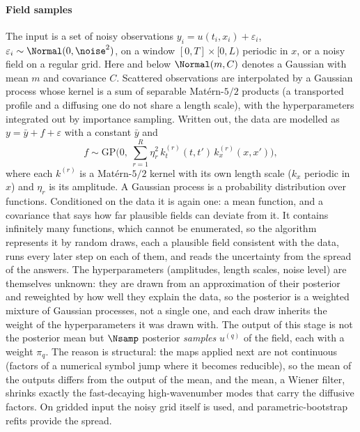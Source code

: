 \paragraph{Field samples} The input is a set of noisy observations $y_i=u(t_i,x_i)+\varepsilon_i$,
$\varepsilon_i\sim\Normal(0,\noise^2)$, on a window $[0,T]\times[0,L)$ periodic in $x$, or a noisy field on a regular grid. Here and below $\Normal(m,C)$ denotes a Gaussian with mean $m$ and covariance $C$.
Scattered observations are interpolated by a Gaussian process whose kernel is a sum of separable Mat\'ern-$5/2$
products (a transported profile and a diffusing one do not share a length scale), with the hyperparameters integrated
out by importance sampling. Written out, the data are modelled as $y=\bar y+f+\varepsilon$ with a constant $\bar y$ and
\begin{equation}\label{eq:gp}
  f\sim\mathrm{GP}\Big(0,\ \sum_{r=1}^R\eta_r^2\,k_t^{(r)}(t,t')\,k_x^{(r)}(x,x')\Big),
\end{equation}
where each $k^{(r)}$ is a Mat\'ern-$5/2$ kernel with its own length scale ($k_x$ periodic in $x$) and $\eta_r$ is its
amplitude. A Gaussian process is a probability distribution over functions. Conditioned on the data it is again one: a
mean function, and a covariance that says how far plausible fields can deviate from it. It contains infinitely many
functions, which cannot be enumerated, so the algorithm represents it by random draws, each a plausible field
consistent with the data, runs every later step on each of them, and reads the uncertainty from the spread of the
answers. The hyperparameters (amplitudes, length scales, noise level) are themselves unknown: they are drawn from an
approximation of their posterior and reweighted by how well they explain the data, so the posterior is a weighted
mixture of Gaussian processes, not a single one, and each draw inherits the weight of the hyperparameters it was drawn
with. The output of this stage is not the posterior mean but $\Nsamp$ posterior \emph{samples}
$u^{(q)}$ of the field, each with a weight $\pi_q$. The reason is structural: the maps applied next are not continuous
(factors of a numerical symbol jump where it becomes reducible), so the mean of the outputs differs from the output of
the mean, and the mean, a Wiener filter, shrinks exactly the fast-decaying high-wavenumber modes that carry the
diffusive factors. On gridded input the noisy grid itself is used, and parametric-bootstrap refits provide the spread.

